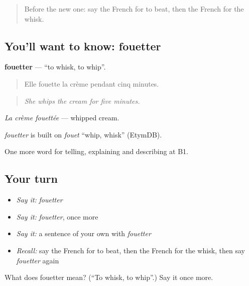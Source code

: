 \label{lesson:FR-C329-fouetter}



\begin{quote}
Before the new one: say the French for to beat, then the French for the whisk.
\end{quote}

\subsection*{You'll want to know: fouetter}
\textbf{fouetter} — \textquotedblleft{}to whisk, to whip\textquotedblright{}.

\begin{quote}
Elle fouette la crème pendant cinq minutes.
\end{quote}

\begin{quote}
\emph{She whips the cream for five minutes.}
\end{quote}

\emph{La crème fouettée} — whipped cream.

\begin{cousinweb}
\emph{fouetter} is built on \emph{fouet} \textquotedblleft{}whip, whisk\textquotedblright{} (EtymDB).
\end{cousinweb}

\begin{grammarlens}[title={What you've built}]
One more word for telling, explaining and describing at B1.
\end{grammarlens}

\subsection*{Your turn}
\begin{itemize}
\raggedright
  \item \emph{Say it:} \emph{fouetter}
  \item \emph{Say it:} \emph{fouetter}, once more
  \item \emph{Say it:} a sentence of your own with \emph{fouetter}
  \item \emph{Recall:} say the French for to beat, then the French for the whisk, then say \emph{fouetter} again
\end{itemize}

\begin{tcolorbox}[breakable,colback=teal!4,colframe=teal!35!black,title={Before you move on}]
What does fouetter mean? (\textquotedblleft{}To whisk, to whip\textquotedblright{}.) Say it once more.
\end{tcolorbox}
